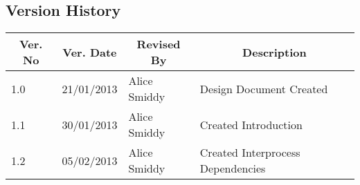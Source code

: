 \subsection{Version History}

\def\Version#1#2#3#4{\hline #1 & #2 & #3 & #4 \\}
\def\Header#1{\multicolumn{1}{|c|}{\bf\small #1}}

{\footnotesize
    \renewcommand{\arraystretch}{1.5}
    \begin{tabularx}{\textwidth}{|l|l|l|X|}
        \hline
        \Header{Ver. No} &
        \Header{Ver. Date} &
        \Header{Revised By} &
        \Header{Description} \\

        \Version{1.0}{21/01/2013}{Alice Smiddy}{Design Document Created}
        \Version{1.1}{30/01/2013}{Alice Smiddy}{Created Introduction}
        \Version{1.2}{05/02/2013}{Alice Smiddy}{Created Interprocess Dependencies}
        \hline
    \end{tabularx}
}
